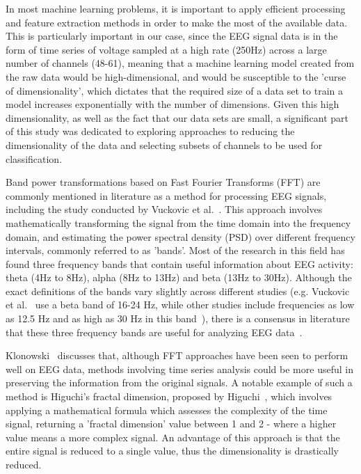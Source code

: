 \documentclass{mpaper}
\begin{document}
In most machine learning problems, it is important to apply efficient processing and feature extraction methods in order to make the most of the available data. This is particularly important in our case, since the EEG signal data is in the form of time series of voltage sampled at a high rate (250Hz) across a large number of channels (48-61), meaning that a machine learning model created from the raw data would be high-dimensional, and would be susceptible to the 'curse of dimensionality', which dictates that the required size of a data set to train a model increases exponentially with the number of dimensions. Given this high dimensionality, as well as the fact that our data sets are small, a significant part of this study was dedicated to exploring approaches to reducing the dimensionality of the data and selecting subsets of channels to be used for classification.

Band power transformations based on Fast Fourier Transforms (FFT) are commonly mentioned in literature as a method for processing EEG signals, including the study conducted by Vuckovic et al.~\cite{vuckovic_dynamic_2014}. This approach involves mathematically transforming the signal from the time domain into the frequency domain, and estimating the power spectral density (PSD) over different frequency intervals, commonly referred to as 'bands'. Most of the research in this field has found three frequency bands that contain useful information about EEG activity: theta (4Hz to 8Hz), alpha (8Hz to 13Hz) and beta (13Hz to 30Hz). Although the exact definitions of the bands vary slightly across different studies (e.g. Vuckovic et al.~\cite{vuckovic_dynamic_2014} use a beta band of 16-24 Hz, while other studies include frequencies as low as 12.5 Hz and as high as 30 Hz in this band~\cite{rangaswamy_beta_2002, subasi_neural_2005}), there is a consensus in literature that these three frequency bands are useful for analyzing EEG data~\cite{jarjees_causality_2017,rangaswamy_beta_2002,subasi_neural_2005,vuckovic_prediction_2018,vuckovic_dynamic_2014}.

Klonowski~\cite{klonowski_everything_2009} discusses that, although FFT approaches have been seen to perform well on EEG data, methods involving time series analysis could be more useful in preserving the information from the original signals. A notable example of such a method is Higuchi's fractal dimension, proposed by Higuchi~\cite{higuchi_approach_1988}, which involves applying a mathematical formula which assesses the complexity of the time signal, returning a 'fractal dimension' value between 1 and 2 - where a higher value means a more complex signal. An advantage of this approach is that the entire signal is reduced to a single value, thus the dimensionality is drastically reduced.
\end{document}
